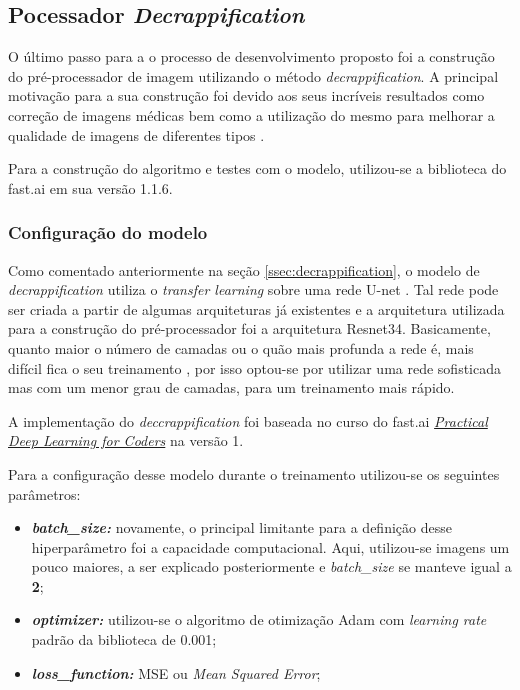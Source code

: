 \subsection{Pocessador \textit{Decrappification}}

O último passo para a o processo de desenvolvimento proposto foi a construção do pré-processador de imagem utilizando o método \textit{decrappification}. A principal motivação para a sua construção foi devido aos seus incríveis resultados como correção de imagens médicas bem como a utilização do mesmo para melhorar a qualidade de imagens de diferentes tipos \cite{f8-decrappification}.

Para a construção do algoritmo e testes com o modelo, utilizou-se a biblioteca do fast.ai em sua versão 1.1.6.

\subsubsection{Configuração do modelo}

Como comentado anteriormente na seção \ref{ssec:decrappification}, o modelo de \textit{decrappification} utiliza o \textit{transfer learning} sobre uma rede U-net \cite{u-net}. Tal rede pode ser criada a partir de algumas arquiteturas já existentes e a arquitetura utilizada para a construção do pré-processador foi a arquitetura Resnet34. Basicamente, quanto maior o número de camadas ou o quão mais profunda a rede é, mais difícil fica o seu treinamento \cite{deep-resnet-for-image-recognition}, por isso optou-se por utilizar uma rede sofisticada mas com um menor grau de camadas, para um treinamento mais rápido.

A implementação do \textit{deccrappification} foi baseada no curso do fast.ai \href{https://course.fast.ai/}\textit{Practical Deep Learning for Coders} na versão 1.

Para a configuração desse modelo durante o treinamento utilizou-se os seguintes parâmetros:

\begin{itemize}
  \item \textit{\textbf{batch\_size:}} novamente, o principal limitante para a definição desse hiperparâmetro foi a capacidade computacional. Aqui, utilizou-se imagens um pouco maiores, a ser explicado posteriormente e \textit{batch\_size} se manteve igual a \textbf{2};
  \item \textbf{\textit{optimizer:}} utilizou-se o algoritmo de otimização Adam com \textit{learning rate} padrão da biblioteca de 0.001;
  \item \textit{\textbf{loss\_function:}} MSE ou \textit{Mean Squared Error};
\end{itemize}


